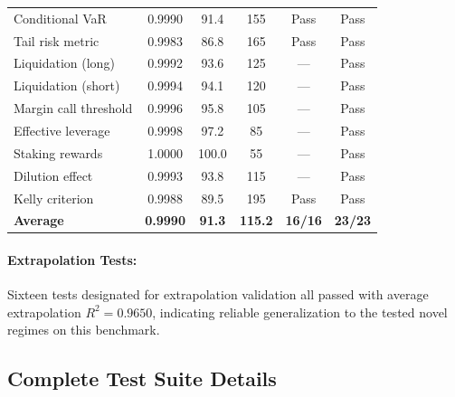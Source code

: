 \documentclass[twoside,11pt]{article}
\begin{document}
\begin{table}[H]
\begin{small}
{\begin{tabular}{@{}lccccc@{}}
Conditional VaR & 0.9990 & 91.4 & 155 & Pass & Pass \\
Tail risk metric & 0.9983 & 86.8 & 165 & Pass & Pass \\
Liquidation (long) & 0.9992 & 93.6 & 125 & --- & Pass \\
Liquidation (short) & 0.9994 & 94.1 & 120 & --- & Pass \\
Margin call threshold & 0.9996 & 95.8 & 105 & --- & Pass \\
Effective leverage & 0.9998 & 97.2 & 85 & --- & Pass \\
Staking rewards & 1.0000 & 100.0 & 55 & --- & Pass \\
Dilution effect & 0.9993 & 93.8 & 115 & --- & Pass \\
Kelly criterion & 0.9988 & 89.5 & 195 & Pass & Pass \\
\midrule
\textbf{Average} & \textbf{0.9990} & \textbf{91.3} & \textbf{115.2} & \textbf{16/16} & \textbf{23/23} \\
\bottomrule
\end{tabular}%
}%
\end{small}
\end{table}

\paragraph{Extrapolation Tests:} Sixteen tests designated for extrapolation validation all passed with average extrapolation $R^2 = 0.9650$, indicating reliable generalization to the tested novel regimes on this benchmark\citep{balestriero2021high,neyshabur2017exploring,zhang2021understanding}.

\subsection{Complete Test Suite Details}
\end{document}
